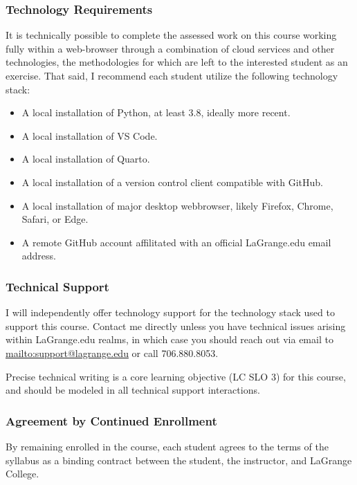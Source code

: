 \documentclass[11pt]{article}
\begin{document}
\subsubsection*{Technology Requirements}

It is technically possible to complete the assessed work on this course working fully within a web-browser through a combination of cloud services and other technologies, the methodologies for which are left to the interested student as an exercise. That said, I recommend each student utilize the following technology stack:

\begin{itemize}
\item A local installation of Python, at least 3.8, ideally more recent.
\item A local installation of VS Code.
\item A local installation of Quarto.
\item A local installation of a version control client compatible with GitHub.
\item A local installation of major desktop webbrowser, likely Firefox, Chrome, Safari, or Edge.
\item A remote GitHub account affilitated with an official LaGrange.edu email address.
\end{itemize}

\subsubsection*{Technical Support}

I will independently offer technology support for the technology stack used to support this course. Contact me directly unless you have technical issues arising within LaGrange.edu realms, in which case you should reach out via email to \href{support@lagrange.edu}{mailto:support@lagrange.edu} or call 706.880.8053.

\skip

Precise technical writing is a core learning objective (LC SLO 3) for this course, and should be modeled in all technical support interactions.

\subsubsection*{Agreement by Continued Enrollment}

By remaining enrolled in the course, each student agrees to the terms of the syllabus as a binding contract between the student, the instructor, and LaGrange College.
\end{document}
